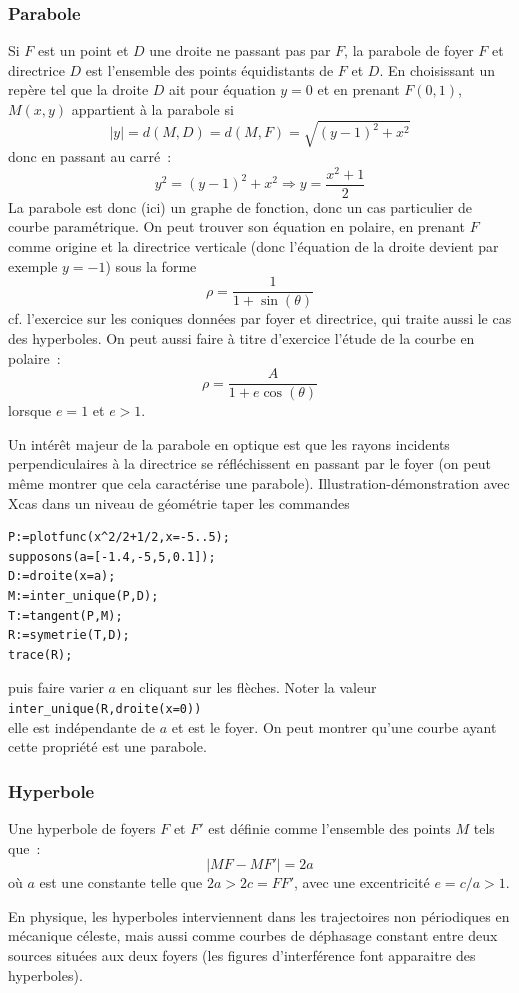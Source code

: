 \documentclass[a4paper,11pt]{article}
\begin{document}
\subsubsection{Parabole}
Si $F$ est un point et $D$ une droite ne passant pas par $F$, la
parabole de foyer $F$ et directrice $D$ est l'ensemble des points
\'equidistants de $F$ et $D$.
En choisissant un rep\`ere tel que la droite $D$ ait pour \'equation
$y=0$ et en prenant $F(0,1)$, $M(x,y)$ appartient \`a la parabole
si 
$$|y|=d(M,D)=d(M,F)=\sqrt{(y-1)^2+x^2} $$
donc en passant au carr\'e~:
$$ y^2=(y-1)^2+x^2 \Rightarrow y=\frac{x^2+1}{2}$$
La parabole est donc (ici) un graphe de fonction, donc
un cas particulier de courbe param\'etrique.
On peut trouver son \'equation en polaire,
en prenant $F$ comme origine et la directrice
verticale (donc l'\'equation de la droite
devient par exemple $y=-1$) sous la forme
$$ \rho=\frac{1}{1+\sin(\theta)}$$
cf. l'exercice sur les coniques donn\'ees par foyer et directrice,
qui traite aussi le cas des hyperboles. On peut aussi faire \`a
titre d'exercice l'\'etude de la courbe en polaire~:
\[ \rho = \frac{A}{1+e\cos(\theta)}\]
lorsque $e=1$ et $e>1$.

Un int\'er\^et majeur de la parabole en optique est que
les rayons incidents perpendiculaires \`a la directrice
se r\'efl\'echissent en passant par le
foyer (on peut m\^eme montrer que cela caract\'erise
une parabole). Illustration-d\'emonstration
avec Xcas dans un niveau de g\'eom\'etrie taper les commandes
\begin{verbatim}
P:=plotfunc(x^2/2+1/2,x=-5..5);
supposons(a=[-1.4,-5,5,0.1]);
D:=droite(x=a);
M:=inter_unique(P,D);
T:=tangent(P,M);
R:=symetrie(T,D);
trace(R);
\end{verbatim}
puis faire varier $a$ en cliquant sur les fl\`eches. Noter
la valeur\\ \verb|inter_unique(R,droite(x=0))|\\
elle est ind\'ependante de $a$ et est le foyer. On peut
montrer qu'une courbe ayant cette propri\'et\'e est
une parabole.
 
\subsubsection{Hyperbole}
Une hyperbole de foyers $F$ et $F'$ est d\'efinie comme l'ensemble
des points $M$ tels que~:
$$ |MF-MF'|=2a$$
o\`u $a$ est une constante telle que $2a>2c=FF'$, avec une excentricit\'e
$e=c/a>1$.

En physique, les hyperboles interviennent dans les trajectoires non
p\'eriodiques en m\'ecanique c\'eleste, mais aussi comme courbes 
de d\'ephasage constant entre deux sources situ\'ees aux deux foyers
(les figures d'interf\'erence font apparaitre des hyperboles).
\end{document}
